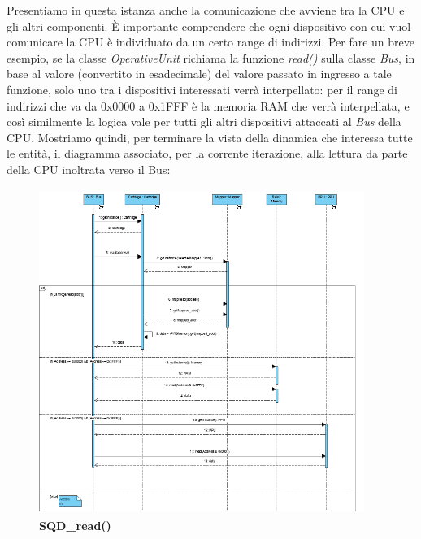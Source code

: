 \documentclass[11pt]{article}
\begin{document}
Presentiamo in questa istanza anche la comunicazione che avviene tra la CPU e gli altri componenti. È importante comprendere che ogni dispositivo con cui vuol comunicare la CPU è individuato da un certo range di indirizzi. Per fare un breve esempio, se la classe \emph{OperativeUnit} richiama la funzione \emph{read()} sulla classe \emph{Bus}, in base al valore (convertito in esadecimale) del valore passato in ingresso a tale funzione, solo uno tra i dispositivi interessati verrà interpellato: per il range di indirizzi che va da 0x0000 a 0x1FFF è la memoria RAM che verrà interpellata, e così similmente la logica vale per tutti gli altri dispositivi attaccati al \emph{Bus} della CPU.
\clearpage
Mostriamo quindi, per terminare la vista della dinamica che interessa tutte le entità, il diagramma associato, per la corrente iterazione, alla lettura da parte della CPU inoltrata verso il Bus:
\begin{figure}[h]
\centering
\includegraphics[width=400px, height=400px]{SQD_read().png}\\
\small\textbf{SQD\_read()}
\end{figure}


\clearpage
\end{document}
